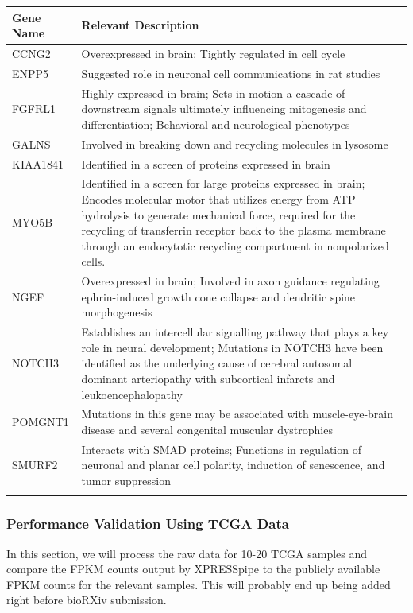 \documentclass[11pt, a4paper, oneside]{article}
\begin{document}
\begin{tabular}{p{2.5cm}p{15.5cm}}
 \textbf{Gene Name} & \textbf{Relevant Description} \\
 \hline
 CCNG2 & Overexpressed in brain; Tightly regulated in cell cycle \\
 \hline
 ENPP5 & Suggested role in neuronal cell communications in rat studies \\
 \hline
 FGFRL1 & Highly expressed in brain; Sets in motion a cascade of downstream signals ultimately influencing mitogenesis and differentiation; Behavioral and neurological phenotypes \\
 \hline
 GALNS & Involved in breaking down and recycling molecules in lysosome \\
 \hline
 KIAA1841 & Identified in a screen of proteins expressed in brain \\
 \hline
 MYO5B & Identified in a screen for large proteins expressed in brain; Encodes molecular motor that utilizes energy from ATP hydrolysis to generate mechanical force, required for the recycling of transferrin receptor back to the plasma membrane through an endocytotic recycling compartment in nonpolarized cells. \\
 \hline
 NGEF & Overexpressed in brain; Involved in axon guidance regulating ephrin-induced growth cone collapse and dendritic spine morphogenesis \\
 \hline
 NOTCH3 & Establishes an intercellular signalling pathway that plays a key role in neural development; Mutations in NOTCH3 have been identified as the underlying cause of cerebral autosomal dominant arteriopathy with subcortical infarcts and leukoencephalopathy \\
 \hline
 POMGNT1 & Mutations in this gene may be associated with muscle-eye-brain disease and several congenital muscular dystrophies \\
 \hline
 SMURF2 & Interacts with SMAD proteins; Functions in regulation of neuronal and planar cell polarity, induction of senescence, and tumor suppression \\
 \label{tab:targets}
\end{tabular}
\newline

\subsubsection{Performance Validation Using TCGA Data}
In this section, we will process the raw data for 10-20 TCGA samples and compare the FPKM counts output by XPRESSpipe to the publicly available FPKM counts for the relevant samples.
This will probably end up being added right before bioRXiv submission.
\end{document}
